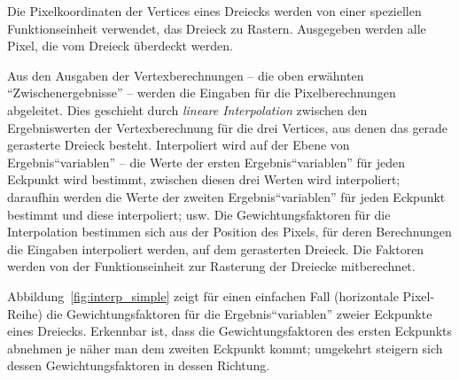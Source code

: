 \documentclass[twoside,a4paper,fleqn,12pt]{book}
\begin{document}
Die Pixelkoordinaten der Vertices eines Dreiecks werden von einer speziellen Funktionseinheit verwendet, das Dreieck zu Rastern.
Ausgegeben werden alle Pixel, die vom Dreieck überdeckt werden. 

Aus den Ausgaben der Vertexberechnungen -- die oben erwähnten "`Zwischenergebnisse"' -- werden die Eingaben für die Pixelberechnungen abgeleitet.
Dies geschieht durch \emph{lineare Interpolation} zwischen den Ergebniswerten der Vertexberechnung für die drei Vertices, aus denen das gerade gerasterte
Dreieck besteht. Interpoliert wird auf der Ebene von Ergebnis"`variablen"' -- die Werte der ersten Ergebnis"`variablen"' für jeden Eckpunkt wird bestimmt,
zwischen diesen drei Werten wird interpoliert; daraufhin werden die Werte der zweiten Ergebnis"`variablen"' für jeden Eckpunkt bestimmt
und diese interpoliert; usw. Die Gewichtungsfaktoren für die Interpolation bestimmen sich aus der Position des Pixels, für deren Berechnungen
die Eingaben interpoliert werden, auf dem gerasterten Dreieck. Die Faktoren werden von der Funktionseinheit zur Rasterung der Dreiecke mitberechnet.

Abbildung~\ref{fig:interp_simple} zeigt für einen einfachen Fall (horizontale Pixel-Reihe) die Gewichtungsfaktoren für die Ergebnis"`variablen"'
zweier Eckpunkte eines Dreiecks. Erkennbar ist, dass die Gewichtungsfaktoren des ersten Eckpunkts abnehmen je näher man
dem zweiten Eckpunkt kommt; umgekehrt steigern sich dessen Gewichtungsfaktoren in dessen Richtung.
\end{document}
